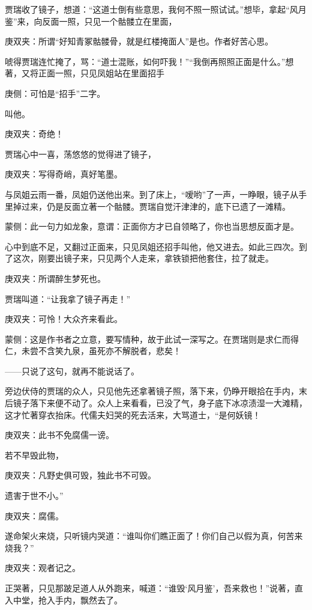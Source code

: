 \begin{parag}
    贾瑞收了镜子，想道：“这道士倒有些意思，我何不照一照试试。”想毕，拿起“风月鉴”来，向反面一照，只见一个骷髅立在里面，\begin{note}庚双夹：所谓“好知青冢骷髅骨，就是红楼掩面人”是也。作者好苦心思。\end{note}唬得贾瑞连忙掩了，骂：“道士混账，如何吓我！”“我倒再照照正面是什么。”想著，又将正面一照，只见凤姐站在里面招手\begin{note}庚侧：可怕是“招手”二字。\end{note}叫他。\begin{note}庚双夹：奇绝！\end{note}贾瑞心中一喜，荡悠悠的觉得进了镜子，\begin{note}庚双夹：写得奇峭，真好笔墨。\end{note}与凤姐云雨一番，凤姐仍送他出来。到了床上，“嗳哟”了一声，一睁眼，镜子从手里掉过来，仍是反面立著一个骷髅。贾瑞自觉汗津津的，底下已遗了一滩精。\begin{note}蒙侧：此一句力如龙象，意谓：正面你方才已自领略了，你也当思想反面才是。\end{note}心中到底不足，又翻过正面来，只见凤姐还招手叫他，他又进去。如此三四次。到了这次，刚要出镜子来，只见两个人走来，拿铁锁把他套住，拉了就走。\begin{note}庚双夹：所谓醉生梦死也。\end{note}贾瑞叫道：“让我拿了镜子再走！”\begin{note}庚双夹：可怜！大众齐来看此。\end{note}\begin{note}蒙侧：这是作书者之立意，要写情种，故于此试一深写之。在贾瑞则是求仁而得仁，未尝不含笑九泉，虽死亦不解脱者，悲矣！\end{note}——只说了这句，就再不能说话了。
\end{parag}


\begin{parag}
    旁边伏侍的贾瑞的众人，只见他先还拿著镜子照，落下来，仍睁开眼拾在手内，末后镜子落下来便不动了。众人上来看看，已没了气，身子底下冰凉渍湿一大滩精，这才忙著穿衣抬床。代儒夫妇哭的死去活来，大骂道士，“是何妖镜！\begin{note}庚双夹：此书不免腐儒一谤。\end{note}若不早毁此物，\begin{note}庚双夹：凡野史俱可毁，独此书不可毁。\end{note}遗害于世不小。”\begin{note}庚双夹：腐儒。\end{note}遂命架火来烧，只听镜内哭道：“谁叫你们瞧正面了！你们自己以假为真，何苦来烧我？”\begin{note}庚双夹：观者记之。\end{note}正哭著，只见那跛足道人从外跑来，喊道：“谁毁‘风月鉴’，吾来救也！”说著，直入中堂，抢入手内，飘然去了。
\end{parag}


